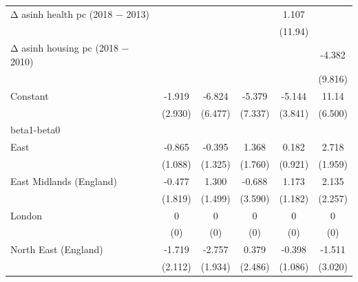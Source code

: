 \begin{table}[htbp]
\begin{tabular}{l*{5}{c}}
\addlinespace
Δ asinh health pc (2018 − 2013)&                     &                     &                     &       1.107         &                     \\
                    &                     &                     &                     &     (11.94)         &                     \\
\addlinespace
Δ asinh housing pc (2018 − 2010)&                     &                     &                     &                     &      -4.382         \\
                    &                     &                     &                     &                     &     (9.816)         \\
\addlinespace
Constant            &      -1.919         &      -6.824         &      -5.379         &      -5.144         &       11.14\sym{*}  \\
                    &     (2.930)         &     (6.477)         &     (7.337)         &     (3.841)         &     (6.500)         \\
\midrule
beta1-beta0         &                     &                     &                     &                     &                     \\
East                &      -0.865         &      -0.395         &       1.368         &       0.182         &       2.718         \\
                    &     (1.088)         &     (1.325)         &     (1.760)         &     (0.921)         &     (1.959)         \\
\addlinespace
East Midlands (England)&      -0.477         &       1.300         &      -0.688         &       1.173         &       2.135         \\
                    &     (1.819)         &     (1.499)         &     (3.590)         &     (1.182)         &     (2.257)         \\
\addlinespace
London              &           0         &           0         &           0         &           0         &           0         \\
                    &         (0)         &         (0)         &         (0)         &         (0)         &         (0)         \\
\addlinespace
North East (England)&      -1.719         &      -2.757         &       0.379         &      -0.398         &      -1.511         \\
                    &     (2.112)         &     (1.934)         &     (2.486)         &     (1.086)         &     (3.020)         \\

\end{tabular}
\end{table}
